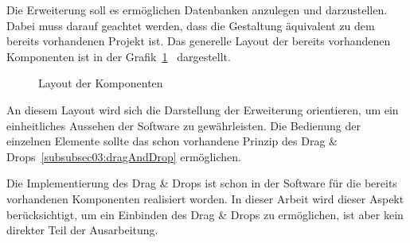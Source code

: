 Die Erweiterung soll es ermöglichen Datenbanken anzulegen und darzustellen. Dabei muss darauf geachtet werden, dass die Gestaltung äquivalent zu dem bereits vorhandenen Projekt ist.
Das generelle Layout der bereits vorhandenen Komponenten ist in der Grafik~\ref{pic:layout}~\cite{mastersthesis_mri}
dargestellt.

\begin{figure}[ht]
        \centering
        \caption{Layout der Komponenten}
        \label{pic:layout}
\end{figure}

An diesem Layout wird sich die Darstellung der Erweiterung orientieren, um ein einheitliches Aussehen der Software zu gewährleisten. 
Die Bedienung der einzelnen Elemente sollte das schon vorhandene Prinzip des Drag \& Drops~\ref{subsubsec03:dragAndDrop} ermöglichen. 

Die Implementierung des Drag \& Drops ist schon in der Software für die bereits vorhandenen Komponenten realisiert worden. In dieser Arbeit wird dieser Aspekt berücksichtigt, um ein Einbinden des Drag \& Drops zu ermöglichen, ist aber kein direkter Teil der Ausarbeitung.

